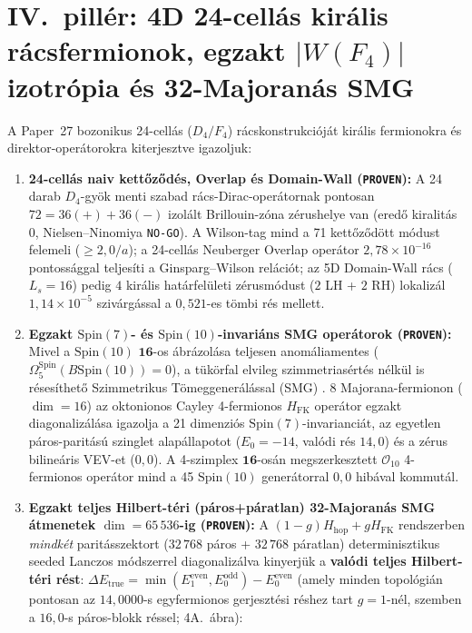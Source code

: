 \documentclass[11pt,a4paper]{article}
\begin{document}
\section{\texorpdfstring{IV.\ pillér: 4D 24-cellás királis rácsfermionok, egzakt $|W(F_4)|$ izotrópia és 32-Majoranás SMG}{IV. pillér: 4D 24-cellás királis rácsfermionok, egzakt |W(F4)| izotrópia és 32-Majoranás SMG}}
A Paper~27 bozonikus 24-cellás ($D_4/F_4$) rácskonstrukcióját királis fermionokra és direktor-operátorokra kiterjesztve igazoljuk:
\begin{enumerate}
    \item \textbf{24-cellás naiv kettőződés, Overlap és Domain-Wall (\texttt{PROVEN}):}
    A 24 darab $D_4$-gyök menti szabad rács-Dirac-operátornak pontosan $72 = 36(+) + 36(-)$ izolált Brillouin-zóna zérushelye van (eredő kiralitás $0$, Nielsen--Ninomiya \texttt{NO-GO}). A Wilson-tag mind a 71 kettőződött módust felemeli ($\ge 2{,}0/a$); a 24-cellás Neuberger Overlap operátor $2{,}78\times 10^{-16}$ pontossággal teljesíti a Ginsparg--Wilson relációt; az 5D Domain-Wall rács ($L_s = 16$) pedig $4$ királis határfelületi zérusmódust ($2$ LH + $2$ RH) lokalizál $1{,}14\times 10^{-5}$ szivárgással a $0{,}521$-es tömbi rés mellett.
    \item \textbf{Egzakt $\mathrm{Spin}(7)$- és $\mathrm{Spin}(10)$-invariáns SMG operátorok (\texttt{PROVEN}):}
    Mivel a $\mathrm{Spin}(10)$ $\mathbf{16}$-os ábrázolása teljesen anomáliamentes ($\Omega_5^{\mathrm{Spin}}(B\mathrm{Spin}(10)) = 0$), a tükörfal elvileg szimmetriasértés nélkül is résesíthető Szimmetrikus Tömeggenerálással (SMG) \cite{FidkowskiKitaev2010,WangWen2018}. 8 Majorana-fermionon ($\dim = 16$) az oktonionos Cayley 4-fermionos $H_{\mathrm{FK}}$ operátor egzakt diagonalizálása igazolja a 21 dimenziós $\mathrm{Spin}(7)$-invarianciát, az egyetlen páros-paritású szinglet alapállapotot ($E_0 = -14$, valódi rés $14{,}0$) és a zérus bilineáris VEV-et ($0{,}0$). A 4-szimplex $\mathbf{16}$-osán megszerkesztett $\mathcal{O}_{10}$ 4-fermionos operátor mind a 45 $\mathrm{Spin}(10)$ generátorral $0{,}0$ hibával kommutál.
    \item \textbf{Egzakt teljes Hilbert-téri (páros+páratlan) 32-Majoranás SMG átmenetek $\dim = 65\,536$-ig (\texttt{PROVEN}):}
    A $(1-g)H_{\mathrm{hop}} + g H_{\mathrm{FK}}$ rendszerben \emph{mindkét} paritásszektort ($32\,768$ páros + $32\,768$ páratlan) determinisztikus seeded Lanczos módszerrel diagonalizálva kinyerjük a \textbf{valódi teljes Hilbert-téri rést}: $\Delta E_{\mathrm{true}} = \min(E_1^{\mathrm{even}}, E_0^{\mathrm{odd}}) - E_0^{\mathrm{even}}$ (amely minden topológián pontosan az $14{,}0000$-s egyfermionos gerjesztési réshez tart $g=1$-nél, szemben a $16{,}0$-s páros-blokk réssel; 4A.~ábra):

\end{enumerate}
\end{document}
